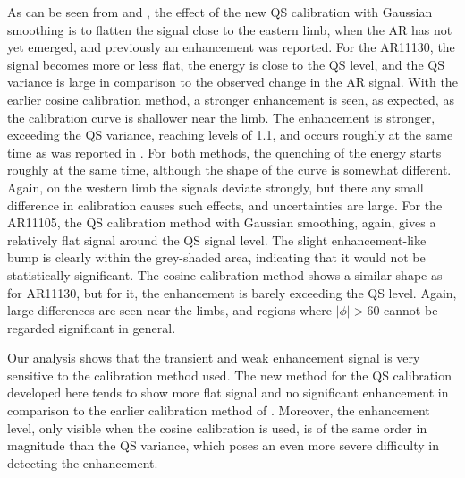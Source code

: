 \documentclass{aa}
\begin{document}
As can be seen
from  and , the effect of the new QS calibration with Gaussian smoothing is
to flatten the \fff signal close to the eastern limb, when the AR has not yet emerged, and previously an enhancement was reported. For the AR11130, the \fff signal becomes more or less flat, the \fff energy is close to the QS level, and the QS variance is large in comparison to the observed change in the AR \fff signal. With the earlier cosine calibration method, a stronger enhancement is seen, as expected, as the calibration curve is shallower near the limb. 
The enhancement is stronger, exceeding the QS variance, reaching levels of 1.1, and occurs roughly at the same time as was reported in \cite{SRB16}. For both methods, the quenching of the \fff energy starts roughly at the same time, although the shape of the curve is somewhat different. Again, on the western limb the \fff signals deviate strongly, but there any small difference in calibration causes such effects, and uncertainties are large. 
For the AR11105, the QS calibration method with Gaussian smoothing, again, gives a relatively flat signal around the QS signal level. The slight enhancement-like bump is clearly within the grey-shaded area, indicating that it would not be statistically significant. The cosine calibration method shows a similar shape as for AR11130, but for it, the enhancement is barely exceeding the QS level. Again, large differences are seen near the limbs, and regions where $|\phi|>60$ cannot be regarded significant in general. 

Our analysis shows that the transient
and weak enhancement signal is very sensitive to the calibration
method used. The new method for the QS calibration developed here tends to show more flat signal and no significant enhancement in comparison to the earlier calibration method of \cite{SRB16}. Moreover, the enhancement level, only visible
when the cosine calibration is used, is of the same order 
in magnitude than
the QS variance, which poses an even more severe difficulty in
detecting the enhancement.

\end{document}
